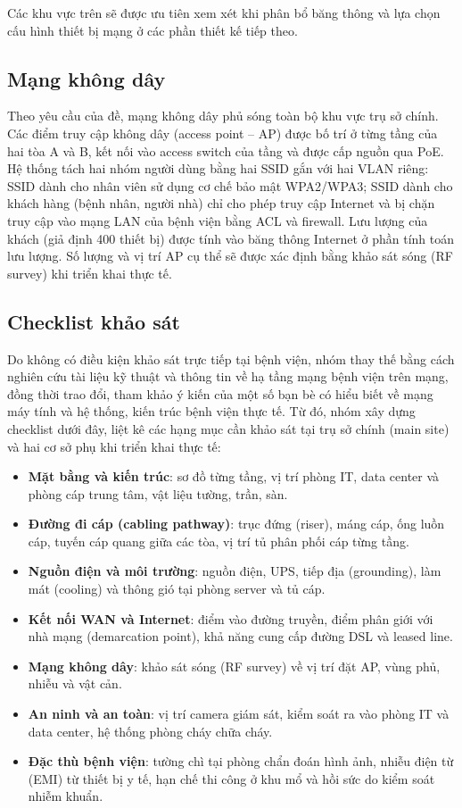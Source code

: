 Các khu vực trên sẽ được ưu tiên xem xét khi phân bổ băng thông và lựa chọn cấu hình thiết bị mạng ở các phần thiết kế tiếp theo.

\subsection{Mạng không dây}
Theo yêu cầu của đề, mạng không dây phủ sóng toàn bộ khu vực trụ sở chính. Các điểm truy cập không dây (access point -- AP) được bố trí ở từng tầng của hai tòa A và B, kết nối vào access switch của tầng và được cấp nguồn qua PoE. Hệ thống tách hai nhóm người dùng bằng hai SSID gắn với hai VLAN riêng: SSID dành cho nhân viên sử dụng cơ chế bảo mật WPA2/WPA3; SSID dành cho khách hàng (bệnh nhân, người nhà) chỉ cho phép truy cập Internet và bị chặn truy cập vào mạng LAN của bệnh viện bằng ACL và firewall. Lưu lượng của khách (giả định 400 thiết bị) được tính vào băng thông Internet ở phần tính toán lưu lượng. Số lượng và vị trí AP cụ thể sẽ được xác định bằng khảo sát sóng (RF survey) khi triển khai thực tế.


\subsection{Checklist khảo sát}
Do không có điều kiện khảo sát trực tiếp tại bệnh viện, nhóm thay thế bằng cách nghiên cứu tài liệu kỹ thuật và thông tin về hạ tầng mạng bệnh viện trên mạng, đồng thời trao đổi, tham khảo ý kiến của một số bạn bè có hiểu biết về mạng máy tính và hệ thống, kiến trúc bệnh viện thực tế. Từ đó, nhóm xây dựng checklist dưới đây, liệt kê các hạng mục cần khảo sát tại trụ sở chính (main site) và hai cơ sở phụ khi triển khai thực tế:
\begin{itemize}
    \item \textbf{Mặt bằng và kiến trúc}: sơ đồ từng tầng, vị trí phòng IT, data center và phòng cáp trung tâm, vật liệu tường, trần, sàn.
    \item \textbf{Đường đi cáp (cabling pathway)}: trục đứng (riser), máng cáp, ống luồn cáp, tuyến cáp quang giữa các tòa, vị trí tủ phân phối cáp từng tầng.
    \item \textbf{Nguồn điện và môi trường}: nguồn điện, UPS, tiếp địa (grounding), làm mát (cooling) và thông gió tại phòng server và tủ cáp.
    \item \textbf{Kết nối WAN và Internet}: điểm vào đường truyền, điểm phân giới với nhà mạng (demarcation point), khả năng cung cấp đường DSL và leased line.
    \item \textbf{Mạng không dây}: khảo sát sóng (RF survey) về vị trí đặt AP, vùng phủ, nhiễu và vật cản.
    \item \textbf{An ninh và an toàn}: vị trí camera giám sát, kiểm soát ra vào phòng IT và data center, hệ thống phòng cháy chữa cháy.
    \item \textbf{Đặc thù bệnh viện}: tường chì tại phòng chẩn đoán hình ảnh, nhiễu điện từ (EMI) từ thiết bị y tế, hạn chế thi công ở khu mổ và hồi sức do kiểm soát nhiễm khuẩn.
\end{itemize}









